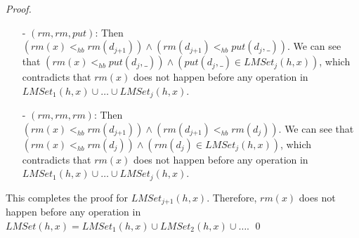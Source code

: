 \begin {proof}
\begin{itemize}
\begin{itemize}
    \item[-] If $\textit{put}(d_{\textit{ind}},\_) <_{hb} \textit{put}(d_{\textit{ind-1}},\_)$ and $\textit{rm}(d_{\textit{ind-1}})$ happens before operations of $d_{\textit{ind-2}}$, then by interval order, we know that $\textit{put}(d_{\textit{ind}},\_)$ happens before operation of $d_{\textit{ind-2}}$, or $\textit{rm}(d_{\textit{ind-1}}) <_{hb} \textit{put}(d_{\textit{ind-1}},\_)$, which is impossible.

    \item[-] If $\textit{put}(d_{\textit{ind}},\_) <_{hb} \textit{rm}(d_{\textit{ind-1}})$, then we obtain $T_{\textit{ind-1}}$, which already contain contradiction.
    \end{itemize}

    By base case $1$, base case $2$ and the induction step, it is easy to see that $T_j$ contains contradiction.

\item[-] $(\textit{rm},\textit{rm},\textit{put})$: Then $( \textit{rm}(x) <_{hb} \textit{rm}(d_{\textit{j+1}}) ) \wedge ( \textit{rm}(d_{\textit{j+1}}) <_{hb} \textit{put}(d_j,\_) )$. We can see that $( \textit{rm}(x) <_{hb} \textit{put}(d_j,\_) ) \wedge ( \textit{put}(d_j,\_) \in \textit{LMSet}_j(h,x) )$, which contradicts that $\textit{rm}(x)$ does not happen before any operation in $\textit{LMSet}_1(h,x) \cup \ldots \cup \textit{LMSet}_j(h,x)$.

\item[-] $(\textit{rm},\textit{rm},\textit{rm})$: Then $( \textit{rm}(x) <_{hb} \textit{rm}(d_{\textit{j+1}}) ) \wedge ( \textit{rm}(d_{\textit{j+1}}) <_{hb} \textit{rm}(d_j) )$. We can see that $( \textit{rm}(x) <_{hb} \textit{rm}(d_j) ) \wedge ( \textit{rm}(d_j) \in \textit{LMSet}_j(h,x) )$, which contradicts that $\textit{rm}(x)$ does not happen before any operation in $\textit{LMSet}_1(h,x) \cup \ldots \cup \textit{LMSet}_j(h,x)$.
\end{itemize}

This completes the proof for $\textit{LMSet}_{\textit{j+1}}(h,x)$. Therefore, $\textit{rm}(x)$ does not happen before any operation in $\textit{LMSet}(h,x) = \textit{LMSet}_1(h,x) \cup \textit{LMSet}_2(h,x) \cup \ldots$. \qed
\end {proof}


